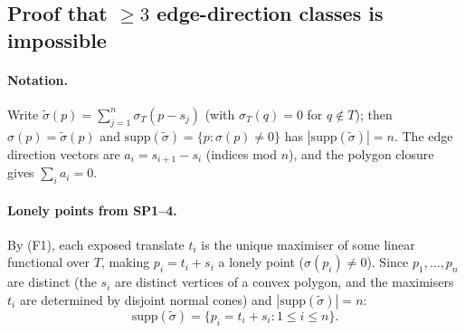 %
%
%

\subsection*{Proof that $\geq 3$ edge-direction classes is impossible}

\paragraph{Notation.}
Write $\tilde\sigma(p)=\sum_{j=1}^n \sigma_T(p-s_j)$ (with $\sigma_T(q)=0$
for $q\notin T$); then $\sigma(p)=\tilde\sigma(p)$ and
$\mathrm{supp}(\tilde\sigma)=\{p:\sigma(p)\ne 0\}$ has $|\mathrm{supp}(\tilde\sigma)|=n$.
The edge direction vectors are $a_i = s_{i+1}-s_i$ (indices mod $n$), and the
polygon closure gives $\sum_i a_i = 0$.

\paragraph{Lonely points from SP1--4.}
By (F1), each exposed translate $t_i$ is the unique maximiser of some
linear functional over $T$, making $p_i=t_i+s_i$ a lonely point
($\sigma(p_i)\ne 0$).  Since $p_1,\ldots,p_n$ are distinct (the $s_i$
are distinct vertices of a convex polygon, and the maximisers $t_i$ are
determined by disjoint normal cones) and $|\mathrm{supp}(\tilde\sigma)|=n$:
\begin{equation}\label{eq:lonely}
  \mathrm{supp}(\tilde\sigma) = \{p_i = t_i+s_i : 1\le i\le n\}.
\end{equation}

